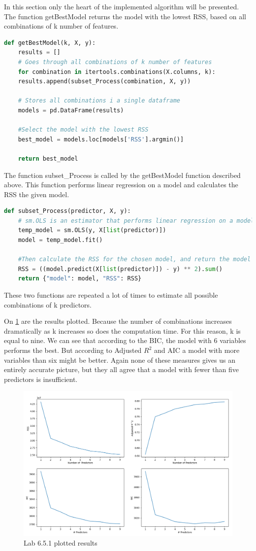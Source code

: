 In this section only the heart of the implemented algorithm will be presented. 
The function getBestModel returns the model with the lowest RSS, based on all combinations of k number of features.

\begin{lstlisting}[language=Python]
def getBestModel(k, X, y):
	results = []
	# Goes through all combinations of k number of features
	for combination in itertools.combinations(X.columns, k):
	results.append(subset_Process(combination, X, y))

	# Stores all combinations i a single dataframe
	models = pd.DataFrame(results)

	#Select the model with the lowest RSS
	best_model = models.loc[models['RSS'].argmin()]

	return best_model

\end{lstlisting}

The function subset\_Process is called by the getBestModel function described above. This function performs linear regression on a model and calculates the RSS the given model.

\begin{lstlisting}[language=Python]
def subset_Process(predictor, X, y):
	# sm.OLS is an estimator that performs linear regression on a model
	temp_model = sm.OLS(y, X[list(predictor)])
	model = temp_model.fit()

	#Then calculate the RSS for the chosen model, and return the model and its RSS together
	RSS = ((model.predict(X[list(predictor)]) - y) ** 2).sum()
	return {"model": model, "RSS": RSS}

\end{lstlisting}

These two functions are repeated a lot of times to estimate all possible combinations of k predictors.

On \cref{fig:Lab_6_5_1_plot} are the results plotted. Because the number of combinations increases dramatically as k increases so does the computation time. For this reason, k is equal to nine. 
We can see that according to the BIC, the model with 6 variables performs the best. But according to Adjusted $R^2$ and AIC a model with more variables than six might be better. Again none of these measures gives us an entirely accurate picture, but they all agree that a model with fewer than five predictors is insufficient.

\begin{figure}[H]
	\centering
	\includegraphics[width=12cm]{Img/Lab_6_5_1_plot.PNG}
	\caption{Lab 6.5.1 plotted results}
	\label{fig:Lab_6_5_1_plot}
\end{figure} 
